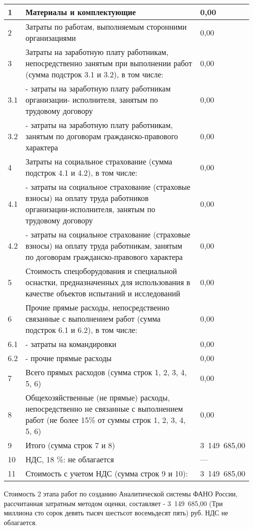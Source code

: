 \begin{center}
\begin{longtable}{|p{40pt}|p{280pt}|p{90pt}|}
1	& Материалы и комплектующие	& 0,00 \\ \hline
2	& Затраты по работам, выполняемым сторонними организациями	& 0,00 \\ \hline
3	& Затраты на заработную плату работникам, непосредственно занятым при выполнении работ (сумма подстрок 3.1 и 3.2), в том числе:	& 0,00 \\ \hline
3.1	& - затраты на заработную плату работникам организации- исполнителя, занятым по трудовому договору	& 0,00 \\ \hline
3.2	& - затраты на заработную плату работникам, занятым по договорам гражданско-правового характера	& 0,00 \\ \hline
4	& Затраты на социальное страхование (сумма подстрок 4.1 и 4.2), в том числе: &	0,00 \\ \hline
4.1	& - затраты на социальное страхование (страховые взносы) на оплату труда работников организации-исполнителя, занятым по трудовому договору	& 0,00 \\ \hline
4.2	& - затраты на социальное страхование (страховые взносы) на оплату труда работникам, занятым по договорам гражданско-правового характера	& 0,00 \\ \hline
5	& Стоимость спецоборудования и специальной оснастки, предназначенных для использования в качестве объектов испытаний и исследований	& 0,00 \\ \hline
6 &	Прочие прямые расходы, непосредственно связанные с выполнением работ (сумма подстрок 6.1 и 6.2), в том числе:	& 0,00 \\ \hline
6.1	& - затраты на командировки	& 0,00 \\ \hline
6.2	& - прочие прямые расходы	& 0,00 \\ \hline
7	& Всего прямых расходов (сумма строк 1, 2, 3, 4, 5, 6) &	0,00 \\ \hline
8	& Общехозяйственные (не прямые) расходы, непосредственно не связанные с выполнением работ (не более 15\% от суммы строк 1, 2, 3, 4, 5, 6)	& 0,00 \\ \hline
9	& Итого (сумма строк 7 и 8)	& 3~149~685,00 \\ \hline
10	& НДС, 18 \%: не облагается & --- \\ \hline
11 & Стоимость с учетом НДС (сумма строк 9 и 10): &	3~149~685,00 \\ \hline

  \end{longtable}
\end{center}

Стоимость 2 этапа работ по созданию Аналитической системы ФАНО России, рассчитанная затратным методом оценки, составляет - 3~149~685,00 (Три миллиона сто сорок девять тысяч шестьсот восемьдесят пять) руб. НДС не облагается.


